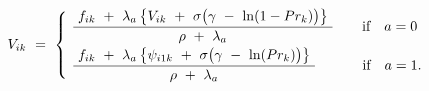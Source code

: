 \begin{equation}
    V_{ik} \ = \
    \begin{cases}
        \begin{split}
            & 
            \ \frac{
                \ f_{ik} \ + \ \lambda_{a} \left\{ V_{ik} \ + \ \sigma \big( \gamma \ - \ \ln(1 - Pr_{k}) \big) \right\} \
            }{
                \rho \ + \ \lambda_{a}
            } \hspace{0.7cm} \text{if \ \ $a = 0$} \\
            &
            \ \frac{
                \ f_{ik} \ + \ \lambda_{a} \left\{ \psi_{i1k} \ + \ \sigma \big( \gamma \ - \ \ln(Pr_{k}) \big) \right\} \
            }{
                \rho \ + \ \lambda_{a}
            } \hspace{1.15cm} \text{if \ \ $a = 1$}.
        \end{split}
    \end{cases}
\label{Equation:Firms-Problem_Euler-Equation}
\end{equation}